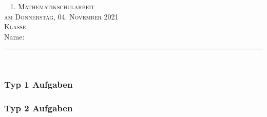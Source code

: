 \documentclass[a4paper,12pt]{article}
\begin{document}
\begin{titlepage}

\flushright
~\vfil 
\textsc{\Huge 1. Mathematikschularbeit}\\ [2cm] 

\textsc{\Large am Donnerstag, 04. November 2021}\\ [1cm] 

\textsc{\Large Klasse } \\ [1cm] 

\Large Name: \rule{8cm}{0.4pt} \\ 

\vfil\vfil\vfil 
\end{titlepage}

\subsubsection{Typ 1 Aufgaben}

\newpage 

\subsubsection{Typ 2 Aufgaben}
\end{document}
